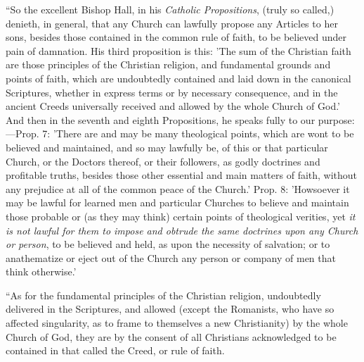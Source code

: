 ``So
the excellent Bishop Hall, in his \emph{Catholic Propositions}, (truly
so called,) denieth, in general, that any Church can lawfully propose
any Articles to her sons, besides those contained in the common rule
of faith, to be believed under pain of damnation. His third
proposition is this: 'The sum of the Christian faith are those
principles of the Christian
religion, and fundamental grounds and points of faith, which are
undoubtedly contained and laid down in the canonical Scriptures,
whether in express terms or by necessary consequence, and in the
ancient Creeds universally received and allowed by the whole Church of
God.' And then in the seventh and eighth Propositions, he speaks fully
to our purpose:—Prop. 7: 'There are and may be many theological
points, which are wont to be believed and maintained, and so may
lawfully be, of this or that particular Church, or the Doctors
thereof, or their followers, as godly doctrines and profitable truths,
besides those other essential and main matters of faith, without any
prejudice at all of the common peace of the Church.' Prop. 8:
'Howsoever it may be lawful for learned men and particular Churches to
believe and maintain those probable or (as they may think) certain
points of theological verities, yet \emph{it is not lawful for them to
impose and obtrude the same doctrines upon any Church or person},
to be believed and held, as upon the necessity of salvation; or to
anathematize or eject out of the Church any person or company of men
that think otherwise.'

``As
for the fundamental principles of the Christian religion, undoubtedly
delivered in the Scriptures, and allowed (except the Romanists, who
have so affected singularity, as to frame to themselves a new
Christianity) by the whole Church of God, they are by the consent of
all Christians acknowledged to be contained in that called the Creed,
or rule of faith.

